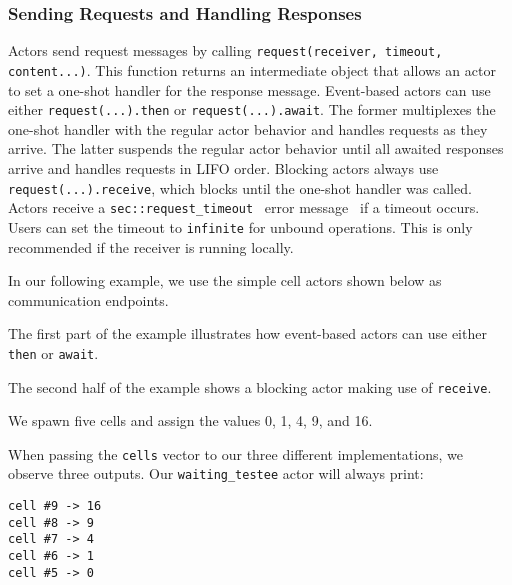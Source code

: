 \subsubsection{Sending Requests and Handling Responses}
\label{handling-response}

Actors send request messages by calling \lstinline^request(receiver, timeout, content...)^. This function returns an intermediate object that allows an actor to set a one-shot handler for the response message. Event-based actors can use either \lstinline^request(...).then^ or \lstinline^request(...).await^. The former multiplexes the one-shot handler with the regular actor behavior and handles requests as they arrive. The latter suspends the regular actor behavior until all awaited responses arrive and handles requests in LIFO order. Blocking actors always use \lstinline^request(...).receive^, which blocks until the one-shot handler was called. Actors receive a \lstinline^sec::request_timeout^~ error message~ if a timeout occurs. Users can set the timeout to \lstinline^infinite^ for unbound operations. This is only recommended if the receiver is running locally.

In our following example, we use the simple cell actors shown below as communication endpoints.



The first part of the example illustrates how event-based actors can use either \lstinline^then^ or \lstinline^await^.



\clearpage
The second half of the example shows a blocking actor making use of \lstinline^receive^.



We spawn five cells and assign the values 0, 1, 4, 9, and 16.



When passing the \lstinline^cells^ vector to our three different implementations, we observe three outputs. Our \lstinline^waiting_testee^ actor will always print:

{\footnotesize\begin{verbatim}
cell #9 -> 16
cell #8 -> 9
cell #7 -> 4
cell #6 -> 1
cell #5 -> 0
\end{verbatim}}

